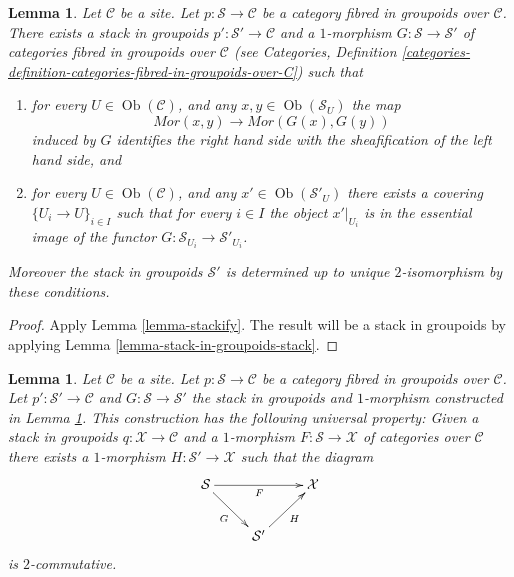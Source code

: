 \documentclass{stacks-project}
\theoremstyle{plain}
\newtheorem{lemma}[subsection]{Lemma}
\theoremstyle{definition}
\theoremstyle{remark}
\numberwithin{equation}{subsection}
\def\Ob{\mathop{\mathrm{Ob}}\nolimits}
\begin{document}
\begin{lemma}
\label{lemma-stackify-groupoids}
Let $\mathcal{C}$ be a site.
Let $p : \mathcal{S} \to \mathcal{C}$ be a category
fibred in groupoids over $\mathcal{C}$.
There exists a stack in groupoids
$p' : \mathcal{S}' \to \mathcal{C}$ and a
$1$-morphism $G : \mathcal{S} \to \mathcal{S}'$
of categories fibred in groupoids over $\mathcal{C}$ (see
Categories, Definition
\ref{categories-definition-categories-fibred-in-groupoids-over-C})
such that
\begin{enumerate}
\item for every $U \in \Ob(\mathcal{C})$, and any
$x, y \in \Ob(\mathcal{S}_U)$ the map
$$
\mathit{Mor}(x, y) \longrightarrow \mathit{Mor}(G(x), G(y))
$$
induced by $G$ identifies the right hand side with the sheafification
of the left hand side, and
\item for every $U \in \Ob(\mathcal{C})$, and any
$x' \in \Ob(\mathcal{S}'_U)$ there exists a covering
$\{U_i \to U\}_{i \in I}$ such that for every $i \in I$ the
object $x'|_{U_i}$ is in the essential image of the
functor $G : \mathcal{S}_{U_i} \to \mathcal{S}'_{U_i}$.
\end{enumerate}
Moreover the stack in groupoids $\mathcal{S}'$ is determined up to unique
$2$-isomorphism by these conditions.
\end{lemma}

\begin{proof}
Apply Lemma \ref{lemma-stackify}. The result will be a
stack in groupoids by applying Lemma \ref{lemma-stack-in-groupoids-stack}.
\end{proof}

\begin{lemma}
\label{lemma-stackify-groupoids-universal-property}
Let $\mathcal{C}$ be a site.
Let $p : \mathcal{S} \to \mathcal{C}$ be a category fibred in groupoids
over $\mathcal{C}$. Let $p' : \mathcal{S}' \to \mathcal{C}$ and
$G : \mathcal{S} \to \mathcal{S}'$
the stack in groupoids and $1$-morphism constructed in
Lemma \ref{lemma-stackify-groupoids}.
This construction has the following universal property: Given a stack
in groupoids $q : \mathcal{X} \to \mathcal{C}$ and a $1$-morphism
$F : \mathcal{S} \to \mathcal{X}$ of categories over $\mathcal{C}$
there exists a $1$-morphism $H : \mathcal{S}' \to \mathcal{X}$
such that the diagram
$$
\xymatrix{
\mathcal{S} \ar[rr]_F \ar[rd]_G & & \mathcal{X} \\
& \mathcal{S}' \ar[ru]_H
}
$$
is $2$-commutative.
\end{lemma}
\end{document}
